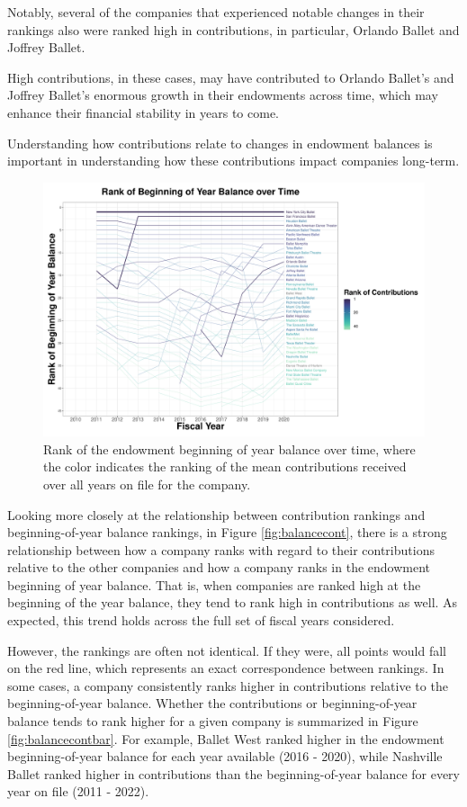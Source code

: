 \documentclass[Dance Data
Project,article,submit,moreauthors,pdftex]{mdpi}
\begin{document}
Notably, several of the companies that experienced notable changes in
their rankings also were ranked high in contributions, in particular,
Orlando Ballet and Joffrey Ballet.

High contributions, in these cases, may have contributed to Orlando
Ballet's and Joffrey Ballet's enormous growth in their endowments across
time, which may enhance their financial stability in years to come.

Understanding how contributions relate to changes in endowment balances
is important in understanding how these contributions impact companies
long-term.

\begin{figure}[H]
\includegraphics[width=0.9\linewidth,]{../images/rank-endowments-color-contribution} \caption{\label{fig:rank-endowments-color-contribution}Rank of the endowment beginning of year balance over time, where the color indicates the ranking of the mean contributions received over all years on file for the company.}\label{fig:unnamed-chunk-4}
\end{figure}

Looking more closely at the relationship between contribution rankings
and beginning-of-year balance rankings, in Figure \ref{fig:balancecont},
there is a strong relationship between how a company ranks with regard
to their contributions relative to the other companies and how a company
ranks in the endowment beginning of year balance. That is, when
companies are ranked high at the beginning of the year balance, they
tend to rank high in contributions as well. As expected, this trend
holds across the full set of fiscal years considered.

However, the rankings are often not identical. If they were, all points
would fall on the red line, which represents an exact correspondence
between rankings. In some cases, a company consistently ranks higher in
contributions relative to the beginning-of-year balance. Whether the
contributions or beginning-of-year balance tends to rank higher for a
given company is summarized in Figure \ref{fig:balancecontbar}. For
example, Ballet West ranked higher in the endowment beginning-of-year
balance for each year available (2016 - 2020), while Nashville Ballet
ranked higher in contributions than the beginning-of-year balance for
every year on file (2011 - 2022).
\end{document}
